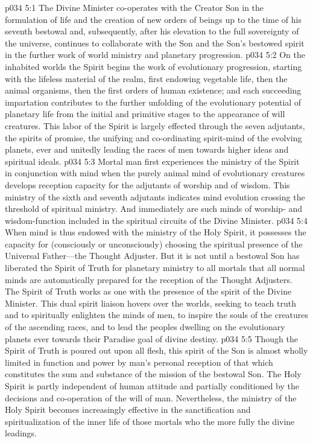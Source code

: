 \vs p034 5:1 The Divine Minister co\hyp{}operates with the Creator Son in the formulation of life and the creation of new orders of beings up to the time of his seventh bestowal and, subsequently, after his elevation to the full sovereignty of the universe, continues to collaborate with the Son and the Son’s bestowed spirit in the further work of world ministry and planetary progression.
\vs p034 5:2 On the inhabited worlds the Spirit begins the work of evolutionary progression, starting with the lifeless material of the realm, first endowing vegetable life, then the animal organisms, then the first orders of human existence; and each succeeding impartation contributes to the further unfolding of the evolutionary potential of planetary life from the initial and primitive stages to the appearance of will creatures. This labor of the Spirit is largely effected through the seven adjutants, the spirits of promise, the unifying and co\hyp{}ordinating spirit\hyp{}mind of the evolving planets, ever and unitedly leading the races of men towards higher ideas and spiritual ideals.
\pc \vs p034 5:3 Mortal man first experiences the ministry of the Spirit in conjunction with mind when the purely animal mind of evolutionary creatures develops reception capacity for the adjutants of worship and of wisdom. This ministry of the sixth and seventh adjutants indicates mind evolution crossing the threshold of spiritual ministry. And immediately are such minds of worship\hyp{} and wisdom\hyp{}function included in the spiritual circuits of the Divine Minister.
\vs p034 5:4 When mind is thus endowed with the ministry of the Holy Spirit, it possesses the capacity for (consciously or unconsciously) choosing the spiritual presence of the Universal Father---the Thought Adjuster. But it is not until a bestowal Son has liberated the Spirit of Truth for planetary ministry to all mortals that all normal minds are automatically prepared for the reception of the Thought Adjusters. The Spirit of Truth works as one with the presence of the spirit of the Divine Minister. This dual spirit liaison hovers over the worlds, seeking to teach truth and to spiritually enlighten the minds of men, to inspire the souls of the creatures of the ascending races, and to lead the peoples dwelling on the evolutionary planets ever towards their Paradise goal of divine destiny.
\vs p034 5:5 Though the Spirit of Truth is poured out upon all flesh, this spirit of the Son is almost wholly limited in function and power by man’s personal reception of that which constitutes the sum and substance of the mission of the bestowal Son. The Holy Spirit is partly independent of human attitude and partially conditioned by the decisions and co\hyp{}operation of the will of man. Nevertheless, the ministry of the Holy Spirit becomes increasingly effective in the sanctification and spiritualization of the inner life of those mortals who the more fully  the divine leadings.
